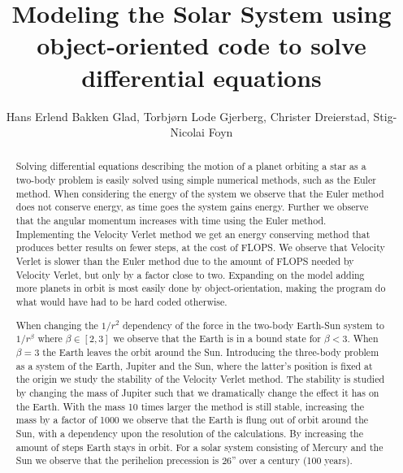 \documentclass{emulateapj}
\begin{document}
\title{Modeling the Solar System using object-oriented code to solve differential equations}

\author{Hans Erlend Bakken Glad, Torbjørn Lode Gjerberg, Christer Dreierstad, Stig-Nicolai Foyn}




\begin{abstract}
Solving differential equations describing the motion of a planet orbiting a star as a two-body problem is easily solved using simple numerical methods, such as the Euler method. When considering the energy of the system we observe that the Euler method does not conserve energy, as time goes the system gains energy. Further we observe that the angular momentum increases with time using the Euler method. Implementing the Velocity Verlet method we get an energy conserving method that produces better results on fewer steps, at the cost of FLOPS. We observe that Velocity Verlet is slower than the Euler method due to the amount of FLOPS needed by Velocity Verlet, but only by a factor close to two. Expanding on the model adding more planets in orbit is most easily done by object-orientation, making the program do what would have had to be hard coded otherwise. 

When changing the $1/r^2$ dependency of the force in the two-body Earth-Sun system to $1/r^{\beta}$ where $\beta \in [2,3]$ we observe that the Earth is in a bound state for $\beta < 3$. When $\beta = 3$ the Earth leaves the orbit around the Sun. Introducing the three-body problem as a system of the Earth, Jupiter and the Sun, where the latter's position is fixed at the origin we study the stability of the Velocity Verlet method. The stability is studied by changing the mass of Jupiter such that we dramatically change the effect it has on the Earth. With the mass 10 times larger the method is still stable, increasing the mass by a factor of 1000 we observe that the Earth is flung out of orbit around the Sun, with a dependency upon the resolution of the calculations. By increasing the amount of steps Earth stays in orbit. For a solar system consisting of Mercury and the Sun we observe that the perihelion precession is 26'' over a century (100 years).

\end{abstract}
\end{document}
